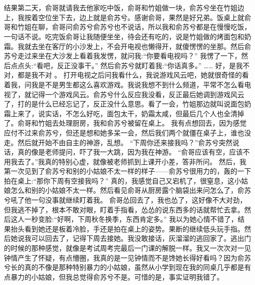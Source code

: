 \chapter{}
结果第二天，俞哥就请我去他家吃中饭，俞哥和竹姐做一块，俞苏兮坐在竹姐边上，我按着空位坐下去，边上就是俞苏兮。感谢俞哥，果然是好兄弟。饭桌上就俞哥和竹姐在聊，俞哥问俞苏兮俞苏兮也不说话，所以我和俞苏兮都是在慢慢吃饭，一句话不说。吃完饭俞哥让我随便坐坐，待会还有吃的，说是竹姐做的烤面包和奶霜。我就去坐在客厅的小沙发上，不会开电视也懒得开，就傻愣愣的坐那。然后俞苏兮走过来坐在大沙发上看着我发愣，就问我:“你要看电视吗？”
我愣了一下，然后点点头:“看吧，反正没事干。”
然后俞苏兮就盯着我:“你话真多。”
……
好，是我不对，都是我不对 。
打开电视之后问我看什么，我说游戏风云吧，她就很奇怪的看着我，问我是不是男生都这么喜欢游戏。我说我想不到什么频道，平常不怎么看电视了，就记得一个游戏风云。俞苏兮什么反应我没看，反正最后她调到游戏风云了，打的是什么已经忘记了，反正没什么意思。看了一会，竹姐那边就叫说面包奶霜上来了，说实话，不怎么好吃，面包太干，奶霜太咸，但最后几个人也全清掉了。俞哥和竹姐去处理厨房，我和俞苏兮被留在桌上。
我有点想回去，因为感觉应付不过来俞苏兮，但还是想和她多呆一会，然后我们两个就僵在桌子上，谁也没走。然后就开始不由自主的神游，乱想。
“下周你还来接我吗？”俞苏兮突然说话，真的像是老师提问，吓了我一大跳，因为我在神游。
“俞哥应该有空，应该不用我去了。”我真的特别心虚，就像被老师抓到上课开小差，答非所问。
然后，我第一次见到了俞苏兮和别的小姑娘不太一样的样子——俞苏兮很用力的，轰的一下拍在桌上:“那你下周有空接我吗？”
真的，我感觉自己又宕机了，很窒息，这小姑娘怎么和别的小姑娘不太一样。然后看见俞哥从厨房露个脑袋出来问怎么了，俞苏兮吼了他一句没事就继续盯着我。
俞哥怂回去了，我也怂了，这好像不大对劲，但我逃不掉了，根本不敢对眼，盯着手指看，怂怂的说东西多的话就帮忙去拿。然后这人一秒变脸:“好啊，下周秋冬换季，东西肯定多。”
我以为她心情不错了，结果抬头看到她还是板着冷脸，手还是拍在桌上的姿势。果断的继续低头玩手指。然后她说我可以回去了，记得下周去接她。我没敢接话，灰溜溜的逃回家了。逃出门的时候的那种感觉，就像是考试周考完最后一门课的解脱一样。我又一次次对一见钟情产生了怀疑，有点懵圈，我真的是一见钟情而不是馋她长得好看吗？因为俞苏兮长的真的不像是那种特别暴力的小姑娘，虽然从小学到现在我的同桌几乎都是有点暴力的小姑娘，但我总觉得俞苏兮不是。可惜的是，事实证明我错了。

